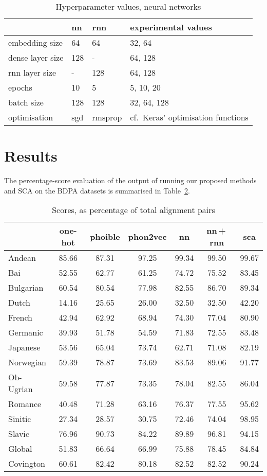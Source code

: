 \documentclass[a4paper]{report}
\begin{document}
\begin{table}[h]
	\centering\small
	\begin{tabular}{*{4}{l}}
		\toprule
		& nn & rnn & experimental values \\
		\midrule
		embedding size & 64 & 64 & 32, 64 \\
		dense layer size & 128 & - & 64, 128 \\
		rnn layer size & - & 128 & 64, 128 \\
		epochs & 10 & 5 & 5, 10, 20 \\
		batch size & 128 & 128 & 32, 64, 128 \\
		optimisation & sgd & rmsprop & cf.~Keras' optimisation functions \\
		\bottomrule
	\end{tabular}
	\caption{Hyperparameter values, neural networks}
	\label{tab:networks}
\end{table}


\section{Results}

The percentage-score evaluation of the output of running our proposed methods and SCA on the BDPA datasets is summarised in Table~\ref{tab:results}.

\begin{table}[h]
	\centering\small
	\begin{tabular}{l *{6}{c}}
		\toprule
		& one-hot & phoible & phon2vec & nn & nn\,+\,rnn & sca \\
		\midrule
		Andean		&	85.66 &	87.31 &	97.25 &	99.34 &	99.50 & 99.67 \\
		Bai			&	52.55 &	62.77 &	61.25 &	74.72 &	75.52 & 83.45 \\
		Bulgarian	&	60.54 &	80.54 &	77.98 &	82.55 &	86.70 & 89.34 \\
		Dutch		&	14.16 &	25.65 &	26.00 &	32.50 &	32.50 & 42.20 \\
		French		&	42.94 &	62.92 &	68.94 &	74.30 &	77.04 & 80.90 \\
		Germanic	&	39.93 &	51.78 &	54.59 &	71.83 &	72.55 & 83.48 \\
		Japanese	&	53.56 &	65.04 &	73.74 &	62.71 &	71.08 & 82.19 \\
		Norwegian	&	59.39 &	78.87 &	73.69 &	83.53 &	89.06 & 91.77 \\
		Ob-Ugrian	&	59.58 &	77.87 &	73.35 &	78.04 &	82.55 & 86.04 \\
		Romance		&	40.48 &	71.28 &	63.16 &	76.37 &	77.55 & 95.62 \\
		Sinitic		&	27.34 &	28.57 &	30.75 &	72.46 &	74.04 & 98.95 \\
		Slavic		&	76.96 &	90.73 &	84.22 &	89.89 &	96.81 & 94.15 \\
		\addlinespace
		Global		&	51.83 &	66.64 &	66.99 &	75.88 &	78.45 & 84.84 \\
		Covington	&	60.61 &	82.42 &	80.18 &	82.52 &	82.52 & 90.24 \\
		\bottomrule
	\end{tabular}
	\caption{Scores, as percentage of total alignment pairs}
	\label{tab:results}
\end{table}
\end{document}
